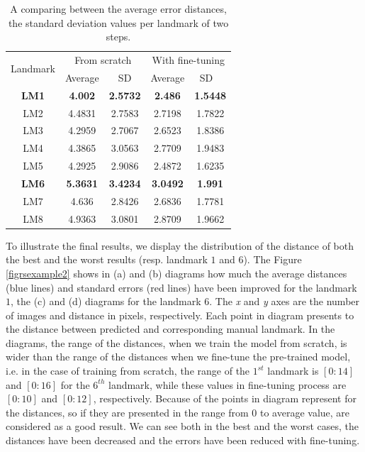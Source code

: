 \documentclass{article} %
\begin{document}
\begin{multicols}{2}
\begin{table}[H]
\centering
\begin{tabular}{ | c | c | c | c | c | }
\hline
	\multicolumn{1}{|c|}{\multirow{2}{*}{Landmark}} & \multicolumn{2}{c|}{From scratch} &  \multicolumn{2}{c|}{With fine-tuning}  \\ \cline{2-5}
	 & Average & SD & Average & SD \  \\ \hline
	\textbf{LM1} & \textbf{4.002} & \textbf{2.5732} & \textbf{2.486} & \textbf{1.5448} \\ \hline
	LM2 & 4.4831 & 2.7583 & 2.7198 & 1.7822 \\ \hline
	LM3 & 4.2959 & 2.7067 & 2.6523 & 1.8386 \\ \hline
	LM4 & 4.3865 & 3.0563 & 2.7709 & 1.9483 \\ \hline
	LM5 & 4.2925 & 2.9086 & 2.4872 & 1.6235 \\ \hline
	\textbf{LM6} & \textbf{5.3631} & \textbf{3.4234} & \textbf{3.0492} & \textbf{1.991} \\ \hline
	LM7 & 4.636 & 2.8426 & 2.6836 & 1.7781 \\ \hline
	LM8 & 4.9363 & 3.0801 & 2.8709 & 1.9662 \\ \hline
\end{tabular}
\caption{\footnotesize{A comparing between the average error distances, the standard deviation values per landmark of two steps.}}
\label{table3}
\end{table}

To illustrate the final results, we display the distribution of the
distance of both the best and the worst results (resp. landmark $1$
and $6$). The Figure \ref{figrsexample2} shows in (a) and (b) diagrams
 how much the average distances (blue lines) and standard errors (red lines) have been improved for the landmark $1$, the (c) and (d) diagrams for the
 landmark $6$. The \textit{x} and \textit{y} axes are the number of images and distance in pixels, respectively. Each point in diagram presents to the distance between predicted and corresponding manual landmark. In the diagrams, the range of the distances, when we train the model from scratch, is wider than the range of the distances when we fine-tune the pre-trained model, i.e. in the case of training from scratch, the range of the $1^{st}$ landmark is $[0:14]$ and $[0:16]$ for the $6^{th}$ landmark, while these values in fine-tuning process are $[0:10]$ and $[0:12]$, respectively. Because of the points in diagram represent for the distances, so if they are presented in the range from $0$ to average value, are considered as a good result. We can see both in the best and the worst cases, the distances have been decreased and the errors have been reduced with fine-tuning.


\end{multicols}
\end{document}
